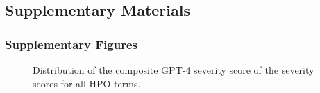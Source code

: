 \documentclass[
]{agujournal2019}
\begin{document}
\newpage{}

\subsection{Supplementary Materials}\label{supplementary-materials}

\subsubsection{Supplementary Figures}\label{supplementary-figures}

\label{cell-fig-severity-histo}
\begin{figure}[H]


\caption{\label{fig-severity-histo}Distribution of the composite GPT-4
severity score of the severity scores for all HPO terms.}

\end{figure}%
\end{document}
